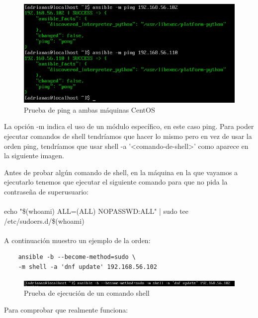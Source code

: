 \begin{figure}[H]
	\centering
	\includegraphics[scale=0.4]{graphics/img17}
	\caption{Prueba de ping a ambas máquinas CentOS}
\end{figure}

La opción -m indica el uso de un módulo específico, en este caso ping. Para poder ejecutar comandos de shell tendríamos que hacer lo mismo pero en vez de usar la orden ping, tendríamos que usar shell -a '<comando-de-shell>' como aparece en la siguiente imagen.

Antes de probar algún comando de shell, en la máquina en la que vayamos a ejecutarlo tenemos que ejecutar el siguiente comando para que no pida la contraseña de superusuario:
\\\\
echo "\$(whoami) ALL=(ALL) NOPASSWD:ALL" | sudo tee /etc/sudoers.d/\$(whoami)
\\\\
A continuación muestro un ejemplo de la orden:

\begin{lstlisting}
	ansible -b --become-method=sudo \
	-m shell -a 'dnf update' 192.168.56.102
\end{lstlisting}

\begin{figure}[H]
	\centering
	\includegraphics[scale=0.4]{graphics/img18}
	\caption{Prueba de ejecución de un comando shell}
\end{figure}

\newpage
Para comprobar que realmente funciona:

